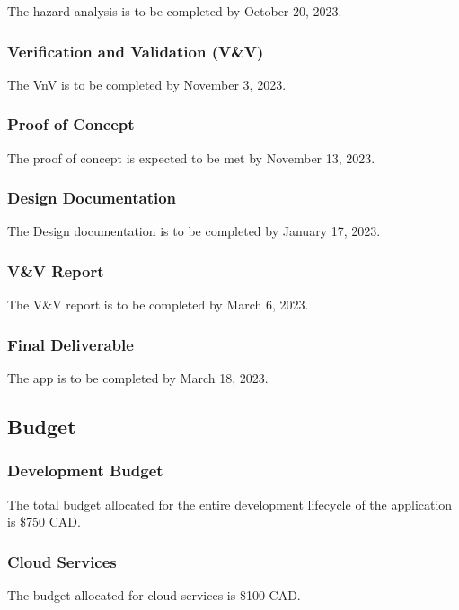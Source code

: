 \documentclass[12pt]{article}
\begin{document}
The hazard analysis is to be completed by October 20, 2023.

\subsubsection{Verification and Validation (V&V)}

The VnV is to be completed by November 3, 2023.

\subsubsection{Proof of Concept}

The proof of concept is expected to be met by November 13, 2023.

\subsubsection{Design Documentation}

The Design documentation is to be completed by January 17, 2023.

\subsubsection{V&V Report}

The V&V report is to be completed by March 6, 2023.

\subsubsection{Final Deliverable}

The app is to be completed by March 18, 2023.

\subsection{Budget}

\subsubsection{Development Budget}

The total budget allocated for the entire development lifecycle of the application is \$750 CAD.

\subsubsection{Cloud Services}

The budget allocated for cloud services is \$100 CAD.
\end{document}
